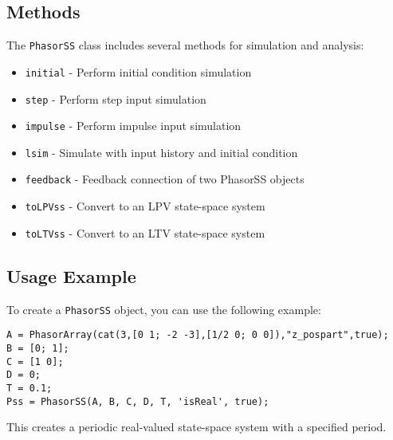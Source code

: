 \documentclass{article}
\begin{document}
\subsection{Methods}

The \texttt{PhasorSS} class includes several methods for simulation and analysis:

\begin{itemize}
    \item \texttt{initial} - Perform initial condition simulation
    \item \texttt{step} - Perform step input simulation
    \item \texttt{impulse} - Perform impulse input simulation
    \item \texttt{lsim} - Simulate with input history and initial condition
    \item \texttt{feedback} - Feedback connection of two PhasorSS objects
    \item \texttt{toLPVss} - Convert to an LPV state-space system
    \item \texttt{toLTVss} - Convert to an LTV state-space system
\end{itemize}

\subsection{Usage Example}

To create a \texttt{PhasorSS} object, you can use the following example:

\begin{verbatim}
A = PhasorArray(cat(3,[0 1; -2 -3],[1/2 0; 0 0]),"z_pospart",true);
B = [0; 1];
C = [1 0];
D = 0;
T = 0.1;
Pss = PhasorSS(A, B, C, D, T, 'isReal', true);
\end{verbatim}

This creates a periodic real-valued state-space system with a specified period.
\end{document}
